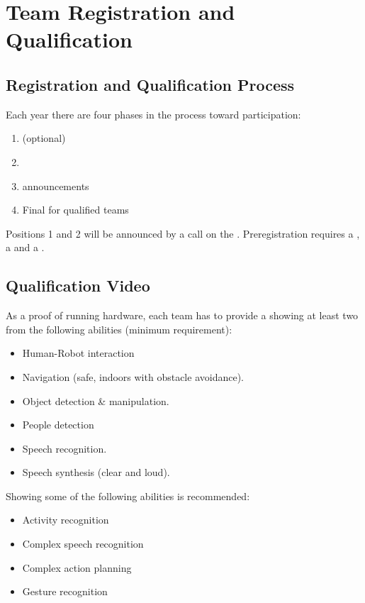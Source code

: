 \section{Team Registration and Qualification}


\subsection{Registration and Qualification Process}
\label{rule:participation}

Each year there are four phases in the process toward participation:
\begin{enumerate}
	\item {} (optional)
	\item {}
	\item {} announcements
	\item Final  for qualified teams
\end{enumerate}
Positions 1 and 2 will be announced by a call on the . Preregistration requires a , a  and a .

\subsection{Qualification Video}
As a proof of running hardware, each team has to provide a  showing at least two from the following abilities (minimum requirement):
\begin{itemize}
	\item Human-Robot interaction
	\item Navigation (safe, indoors with obstacle avoidance).
	\item Object detection \& manipulation.
	\item People detection
	\item Speech recognition.
	\item Speech synthesis (clear and loud).
\end{itemize}

Showing some of the following abilities is recommended:
\begin{itemize}
	\item Activity recognition
	\item Complex speech recognition
	\item Complex action planning
	\item Gesture recognition
\end{itemize}


